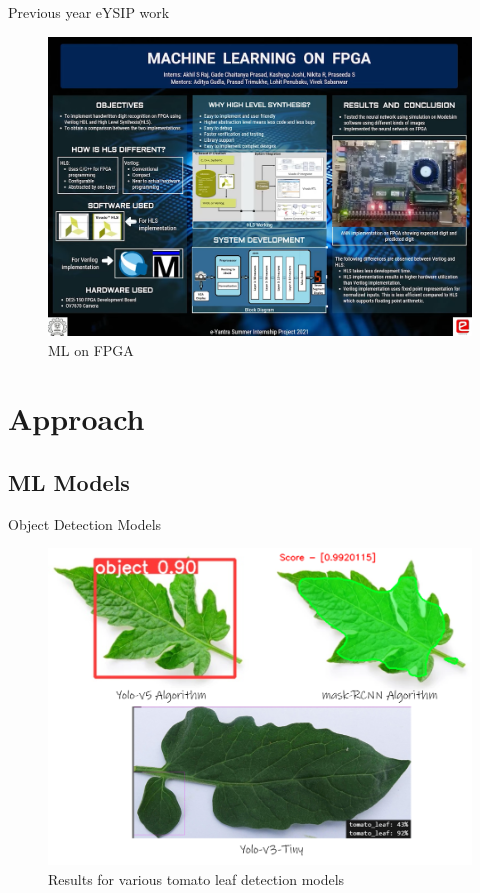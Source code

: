 \documentclass[10pt, a4paper]{beamer}
\begin{document}
\begin{frame}{Previous year eYSIP work}
	\begin{figure}
		\centering
		\includegraphics[scale=0.235]{eYSIP-21}
		\caption{ML on FPGA}
	\end{figure}
\end{frame}

\section{Approach}
\subsection{ML Models}
\begin{frame}{Object Detection Models}
	\begin{figure}
		\centering
		\includegraphics[scale=0.25]{models}
		\caption{Results for various tomato leaf detection models}
	\end{figure}
\end{frame}
\end{document}
